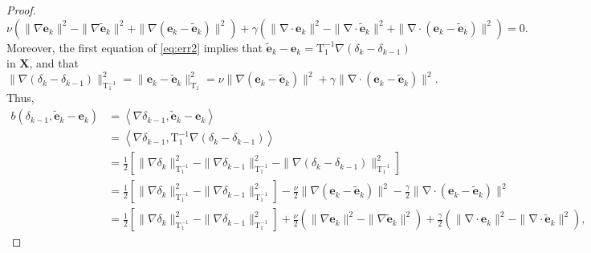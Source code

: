 \documentclass[3p]{elsarticle}
\def\V#1{\mathbf{#1}}
\def\Vt#1{\mathbf{\tilde{#1}}}
\def\VX{\mathbf{X}}
\newcommand{\divergence}{\mathrm{\nabla \cdot}}
\newcommand{\Lumap}{\mathrm{T_1}}
\newcommand{\Luinvmap}{\mathrm{T_1^{-1}}}
\begin{document}
\begin{proof}
\begin{equation}\label{eq:err3}
\nu \left( \|\nabla \V{e}_{k} \|^2 - \|\nabla \Vt{e}_{k} \|^2 + \|\nabla (\V{e}_{k}  - \Vt{e}_{k}) \|^2 \right) + 
\gamma \left( \|\divergence \V{e}_{k} \|^2 - \|\divergence \Vt{e}_{k} \|^2 + \|\divergence (\V{e}_{k}  - \Vt{e}_{k}) \|^2 \right) = 0.
\end{equation}
Moreover, the first equation of \eqref{eq:err2} implies that $\Vt{e}_{k}-\V{e}_{k} = \Luinvmap \nabla (\delta_{k}  - \delta_{k-1})$  in $\VX$, and that
\begin{equation}\label{eq:err4}
\|\nabla (\delta_{k}  - \delta_{k-1}) \|^2_{\Luinvmap} = \|\V{e}_{k}  - \Vt{e}_{k} \|^2_{\Lumap}
= \nu \|\nabla(\V{e}_{k}  - \Vt{e}_{k}) \|^2 + 
\gamma \|\divergence(\V{e}_{k}  - \Vt{e}_{k}) \|^2.
\end{equation}
Thus, 
\begin{equation}
    \label{eq:err5}
    \begin{aligned}        
b(\delta_{k-1}, \Vt{e}_k - \V{e}_k) & = \left\langle \nabla \delta_{k-1},  \Vt{e}_k - \V{e}_k \right \rangle \\ 
& = \left\langle \nabla \delta_{k-1}, \Luinvmap \nabla (\delta_{k}  - \delta_{k-1}) \right \rangle \\
& = \frac{1}{2} \left[\|\nabla \delta_{k} \|^2_{\Luinvmap} - \|\nabla \delta_{k-1} \|^2_{\Luinvmap} - \|\nabla (\delta_{k}  - \delta_{k-1}) \|^2_{\Luinvmap} \right] \\
& = \frac{1}{2} \left[\|\nabla \delta_{k} \|^2_{\Luinvmap} - \|\nabla \delta_{k-1} \|^2_{\Luinvmap} \right]  - \frac{\nu}{2}  \|\nabla (\V{e}_{k}  - \Vt{e}_{k}) \|^2
-\frac{\gamma}{2} \|\divergence(\V{e}_{k}  - \Vt{e}_{k}) \|^2 \\
& = \frac{1}{2} \left[\|\nabla \delta_{k} \|^2_{\Luinvmap} - \|\nabla \delta_{k-1} \|^2_{\Luinvmap} \right] +
\frac{\nu}{2} \left( \|\nabla \V{e}_{k} \|^2 - \|\nabla \Vt{e}_{k} \|^2 \right) + 
\frac{\gamma}{2} \left( \|\divergence \V{e}_{k} \|^2 - \|\divergence \Vt{e}_{k} \|^2\right),
    \end{aligned}
\end{equation}

\end{proof}
\end{document}
